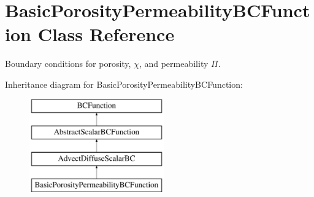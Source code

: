 \hypertarget{class_basic_porosity_permeability_b_c_function}{}\section{Basic\+Porosity\+Permeability\+B\+C\+Function Class Reference}
\label{class_basic_porosity_permeability_b_c_function}


Boundary conditions for porosity, $ \chi $, and permeability $\Pi$.  


Inheritance diagram for Basic\+Porosity\+Permeability\+B\+C\+Function\+:\begin{figure}[H]
\begin{center}
\leavevmode
\includegraphics[height=4.000000cm]{class_basic_porosity_permeability_b_c_function}
\end{center}
\end{figure}
